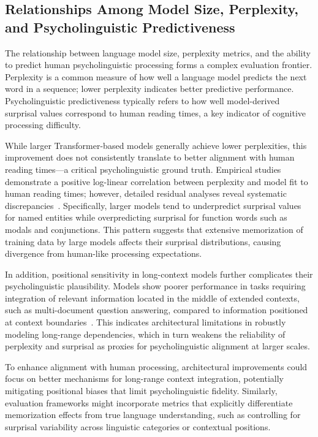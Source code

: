 \documentclass[sigconf]{acmart}
\begin{document}
\subsection{Relationships Among Model Size, Perplexity, and Psycholinguistic Predictiveness}

The relationship between language model size, perplexity metrics, and the ability to predict human psycholinguistic processing forms a complex evaluation frontier. Perplexity is a common measure of how well a language model predicts the next word in a sequence; lower perplexity indicates better predictive performance. Psycholinguistic predictiveness typically refers to how well model-derived surprisal values correspond to human reading times, a key indicator of cognitive processing difficulty.

While larger Transformer-based models generally achieve lower perplexities, this improvement does not consistently translate to better alignment with human reading times—a critical psycholinguistic ground truth. Empirical studies demonstrate a positive log-linear correlation between perplexity and model fit to human reading times; however, detailed residual analyses reveal systematic discrepancies~\cite{ref35}. Specifically, larger models tend to underpredict surprisal values for named entities while overpredicting surprisal for function words such as modals and conjunctions. This pattern suggests that extensive memorization of training data by large models affects their surprisal distributions, causing divergence from human-like processing expectations.

In addition, positional sensitivity in long-context models further complicates their psycholinguistic plausibility. Models show poorer performance in tasks requiring integration of relevant information located in the middle of extended contexts, such as multi-document question answering, compared to information positioned at context boundaries~\cite{ref33}. This indicates architectural limitations in robustly modeling long-range dependencies, which in turn weakens the reliability of perplexity and surprisal as proxies for psycholinguistic alignment at larger scales.

To enhance alignment with human processing, architectural improvements could focus on better mechanisms for long-range context integration, potentially mitigating positional biases that limit psycholinguistic fidelity. Similarly, evaluation frameworks might incorporate metrics that explicitly differentiate memorization effects from true language understanding, such as controlling for surprisal variability across linguistic categories or contextual positions.
\end{document}
